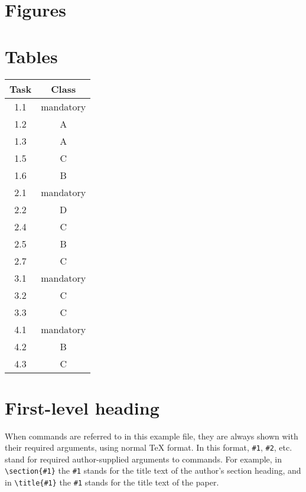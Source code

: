 \documentclass[%
 aip,
 jmp,%
 amsmath,amssymb,
 reprint,%
]{revtex4-1}
\begin{document}
\appendix

\section{\label{sec:level1}Figures}

\section{\label{sec:level1}Tables}



\begin{center}
	\begin{tabular}{|c|c|} 
		\hline
		Task & Class\\ [0.5ex] 
		\hline\hline
		1.1 & mandatory\\ 
		\hline
		1.2 & A\\
		\hline
		1.3 & A\\ 
		\hline
		1.5 & C\\
		\hline
		1.6 & B\\ 
		\hline
		2.1 & mandatory\\
		\hline
		2.2 & D\\ 
		\hline
		2.4 & C\\
		\hline
		2.5 & B\\ 
		\hline
		2.7 & C\\
		\hline
		3.1 & mandatory\\ 
		\hline
		3.2 & C\\
		\hline
		3.3 & C\\
		\hline
		4.1 & mandatory\\ 
		\hline
		4.2 & B\\
		\hline
		4.3 & C \\
		\hline
	\end{tabular}
\end{center}














\clearpage

\section{\label{sec:level1}First-level heading}

When commands are referred to in this example file, they are always
shown with their required arguments, using normal \TeX{} format. In
this format, \verb+#1+, \verb+#2+, etc. stand for required
author-supplied arguments to commands. For example, in
\verb+\section{#1}+ the \verb+#1+ stands for the title text of the
author's section heading, and in \verb+\title{#1}+ the \verb+#1+
stands for the title text of the paper.
\end{document}
